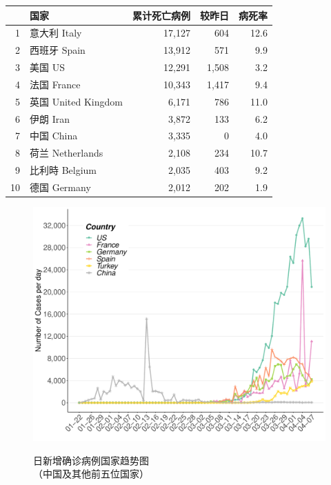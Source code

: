 \documentclass[]{article}
\begin{document}
\begin{table}[H]
\begin{table}[H]
\begin{tabular}{rlrrr}
\toprule
  & 国家 & 累计死亡病例 & 较昨日 & 病死率\\
\midrule
\rowcolor{gray!6}  1 & 意大利 Italy & 17,127 & 604 & 12.6\\
2 & 西班牙 Spain & 13,912 & 571 & 9.9\\
\rowcolor{gray!6}  3 & 美国 US & 12,291 & 1,508 & 3.2\\
4 & 法国 France & 10,343 & 1,417 & 9.4\\
\rowcolor{gray!6}  5 & 英国 United Kingdom & 6,171 & 786 & 11.0\\
6 & 伊朗 Iran & 3,872 & 133 & 6.2\\
\rowcolor{gray!6}  7 & 中国 China & 3,335 & 0 & 4.0\\
8 & 荷兰 Netherlands & 2,108 & 234 & 10.7\\
\rowcolor{gray!6}  9 & 比利時 Belgium & 2,035 & 403 & 9.2\\
10 & 德国 Germany & 2,012 & 202 & 1.9\\
\bottomrule
\end{tabular}
\endgroup{}
\end{table} \end{table}

\begin{figure}[H]
\caption{日新增确诊病例国家趋势图 \\（中国及其他前五位国家）} %
\centering
\includegraphics[]{./input/covid2.pdf} 
\label{} %
\end{figure}
\end{document}
